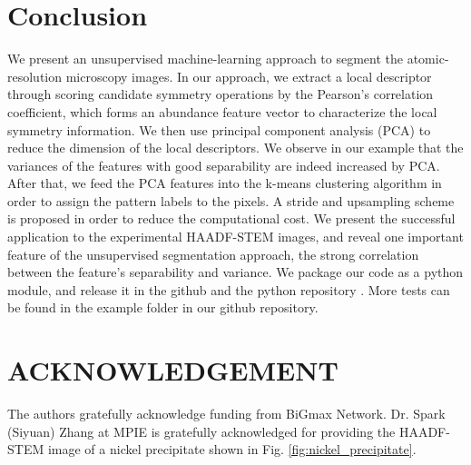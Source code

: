 \documentclass[twocolumn,amsmath, floatfix]{revtex4}
\begin{document}
\section{Conclusion}
We present an unsupervised machine-learning approach to segment the atomic-resolution microscopy images. In our approach, we extract a local descriptor through scoring candidate symmetry operations by the Pearson's correlation coefficient, which forms an abundance feature vector to characterize the local symmetry information. We then use principal component analysis (PCA) to reduce the dimension of the local descriptors. We observe in our example that the variances of the features with good separability are indeed increased by PCA. After that, we feed the PCA features into the k-means clustering algorithm in order to assign the pattern labels to the pixels. A stride and upsampling scheme is proposed in order to reduce the computational cost.
We present the successful application to the experimental HAADF-STEM images, and reveal one important feature of the unsupervised segmentation approach, the strong correlation between the feature's separability and variance.  
We package our code as a python module, and release it in the github \cite{github} and the python repository \cite{pystem}. More tests can be found in the example folder in our github repository. 
\section*{ACKNOWLEDGEMENT}
The authors gratefully acknowledge funding from 
BiGmax Network. Dr. Spark (Siyuan) Zhang at MPIE is gratefully acknowledged for providing the HAADF-STEM image of a nickel precipitate shown in Fig. \ref{fig:nickel_precipitate}.
\end{document}

